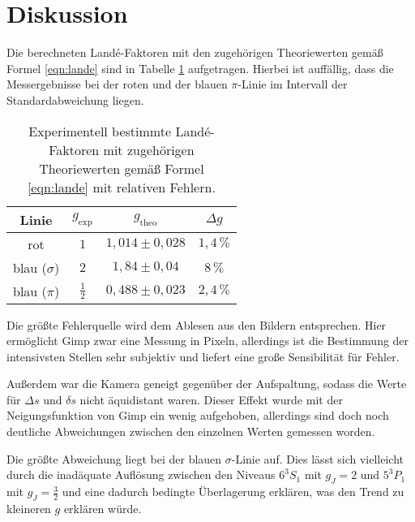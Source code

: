\section{Diskussion}
\label{sec:Diskussion}
Die berechneten Landé-Faktoren mit den zugehörigen Theoriewerten gemäß Formel \eqref{eqn:lande}
sind in Tabelle \ref{tab:result} aufgetragen.
Hierbei ist auffällig, dass die Messergebnisse bei der roten und der blauen $\pi$-Linie
im Intervall der Standardabweichung liegen.
\begin{table}
	\centering
	\caption{Experimentell bestimmte Landé-Faktoren mit zugehörigen Theoriewerten gemäß Formel \eqref{eqn:lande} mit relativen Fehlern.} 
	 \label{tab:result}
	 \begin{tabular}{c | c | c | c}
	 	\toprule
		 Linie & $g_{\text{exp}}$ & $g_{\text{theo}}$ & $\Delta g$ \\
		\midrule
		rot & $1$ & $1,014\pm0,028$ & $1,4\, \si{\percent}$ \\
		blau ($\sigma$) & $2$ & $1,84\pm0,04$ & $8 \, \si{\percent}$ \\
		blau ($\pi$)    & $\frac{1}{2}$ & $0,488\pm0,023$ & $2,4\,\si{\percent}$ \\
		\bottomrule
	\end{tabular}
\end{table}
Die größte Fehlerquelle wird dem Ablesen aus den Bildern entsprechen. Hier ermöglicht
Gimp \cite{gimp} zwar eine Messung in Pixeln, allerdings ist die Bestimmung der intensivsten
Stellen sehr subjektiv und liefert eine große Sensibilität für Fehler.

Außerdem war die Kamera geneigt gegenüber der Aufspaltung, sodass die Werte für $\Delta s$ und
$\delta s$ nicht äquidistant waren. Dieser Effekt wurde mit der Neigungsfunktion von
Gimp \cite{gimp} ein wenig aufgehoben, allerdings sind doch noch deutliche Abweichungen
zwischen den einzelnen Werten gemessen worden.

Die größte Abweichung liegt bei der blauen $\sigma$-Linie auf. Dies lässt sich vielleicht durch
die inadäquate Auflösung zwischen den Niveaus $6^3S_1$ mit $g_J=2$ und $5^3P_1$ mit $g_J=\frac{3}{2}$ und eine dadurch bedingte Überlagerung erklären, was den Trend zu kleineren $g$ erklären würde.
